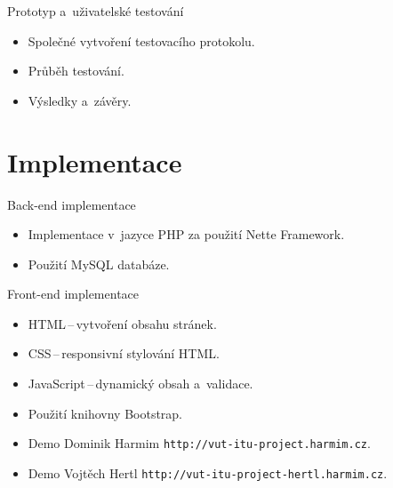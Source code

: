 \documentclass[10pt, hyperref={unicode}]{beamer}
\begin{document}
\begin{frame}{Prototyp a~uživatelské testování}
	\begin{itemize}
		\item Společné vytvoření testovacího protokolu.
		\item Průběh testování.
		\item Výsledky a~závěry.
	\end{itemize}
\end{frame}

\section{Implementace}

\begin{frame}{Back-end implementace}
	\begin{itemize}
		\item Implementace v~jazyce PHP za použití Nette Framework.
		\item Použití MySQL databáze.
	\end{itemize}
\end{frame}

\begin{frame}{Front-end implementace}
	\begin{itemize}
		\item HTML\,--\,vytvoření obsahu stránek.
		\item CSS\,--\,responsivní stylování HTML.
		\item JavaScript\,--\,dynamický obsah a~validace.
		\item Použití knihovny Bootstrap.
		\item Demo Dominik Harmim
			\texttt{http://vut-itu-project.harmim.cz}.
		\item Demo Vojtěch Hertl
			\texttt{http://vut-itu-project-hertl.harmim.cz}.
	\end{itemize}
\end{frame}
\end{document}

